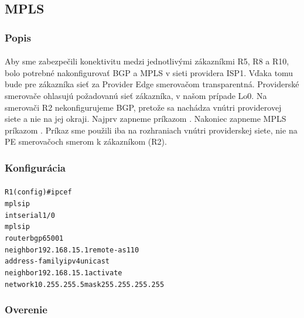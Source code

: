 \documentclass[12pt,twoside,a4paper]{report}
\begin{document}
\subsection{MPLS}
\subsubsection{Popis}
\paragraph{}
Aby sme zabezpečili konektivitu medzi jednotlivými zákazníkmi R5, R8 a R10, bolo potrebné nakonfigurovať BGP a MPLS v sieti providera ISP1. Vďaka tomu bude pre zákazníka sieť za Provider Edge smerovačom transparentná. Providerské smerovače ohlasujú požadovanú sieť zákazníka, v našom prípade Lo0. Na smerovači R2 nekonfigurujeme BGP, pretože sa nachádza vnútri providerovej siete a nie na jej okraji. Najprv zapneme  príkazom . Nakoniec zapneme MPLS príkazom . Príkaz  sme použili iba na rozhraniach vnútri providerskej siete, nie na PE smerovačoch smerom k zákazníkom (R2).

\subsubsection{Konfigurácia}
\paragraph{}
\noindent
{\selectfont
\begin{small}
\begin{alltt}
R1 (config)#ip cef
mpls ip
int serial1/0
  mpls ip
router bgp 65001
  neighbor 192.168.15.1 remote-as 110
  address-family ipv4 unicast
  neighbor 192.168.15.1 activate
  network 10.255.255.5 mask 255.255.255.255
\end{alltt}
\end{small}
}

\subsubsection{Overenie}
\end{document}
